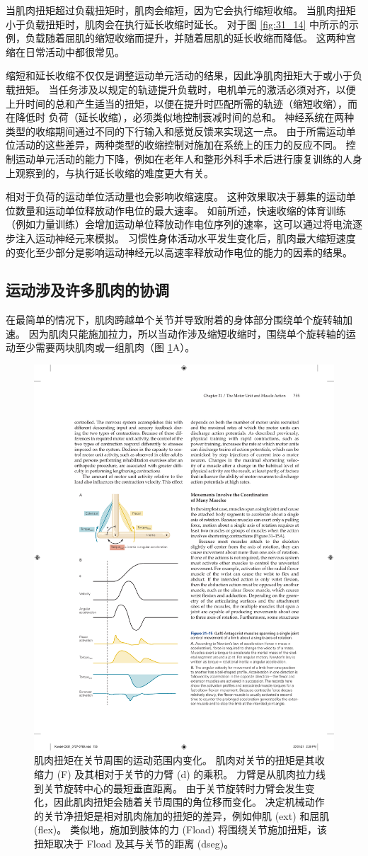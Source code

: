 当肌肉扭矩超过负载扭矩时，肌肉会缩短，因为它会执行缩短收缩。
当肌肉扭矩小于负载扭矩时，肌肉会在执行延长收缩时延长。
对于图 \ref{fig:31_14} 中所示的示例，负载随着屈肌的缩短收缩而提升，并随着屈肌的延长收缩而降低。
这两种宫缩在日常活动中都很常见。


缩短和延长收缩不仅仅是调整运动单元活动的结果，因此净肌肉扭矩大于或小于负载扭矩。
当任务涉及以规定的轨迹提升负载时，电机单元的激活必须对齐，以便上升时间的总和产生适当的扭矩，以便在提升时匹配所需的轨迹（缩短收缩），而在降低时 负荷（延长收缩），必须类似地控制衰减时间的总和。
神经系统在两种类型的收缩期间通过不同的下行输入和感觉反馈来实现这一点。
由于所需运动单位活动的这些差异，两种类型的收缩控制对施加在系统上的压力的反应不同。
控制运动单元活动的能力下降，例如在老年人和整形外科手术后进行康复训练的人身上观察到的，与执行延长收缩的难度更大有关。


相对于负荷的运动单位活动量也会影响收缩速度。
这种效果取决于募集的运动单位数量和运动单位释放动作电位的最大速率。
如前所述，快速收缩的体育训练（例如力量训练）会增加运动单位释放动作电位序列的速率，这可以通过将电流逐步注入运动神经元来模拟。
习惯性身体活动水平发生变化后，肌肉最大缩短速度的变化至少部分是影响运动神经元以高速率释放动作电位的能力的因素的结果。


\subsection{运动涉及许多肌肉的协调}

在最简单的情况下，肌肉跨越单个关节并导致附着的身体部分围绕单个旋转轴加速。
因为肌肉只能施加拉力，所以当动作涉及缩短收缩时，围绕单个旋转轴的运动至少需要两块肌肉或一组肌肉（图 \ref{fig:31_15}A）。


\begin{figure}[htbp]
	\centering
	\includegraphics[width=0.45\linewidth]{chap31/fig_31_15}
	\caption{肌肉扭矩在关节周围的运动范围内变化。 肌肉对关节的扭矩是其收缩力 (F) 及其相对于关节的力臂 (d) 的乘积。 力臂是从肌肉拉力线到关节旋转中心的最短垂直距离。 由于关节旋转时力臂会发生变化，因此肌肉扭矩会随着关节周围的角位移而变化。 决定机械动作的关节净扭矩是相对肌肉施加的扭矩的差异，例如伸肌 (ext) 和屈肌 (flex)。 类似地，施加到肢体的力 (Fload) 将围绕关节施加扭矩，该扭矩取决于 Fload 及其与关节的距离 (dseg)。}
	\label{fig:31_15}
\end{figure}


